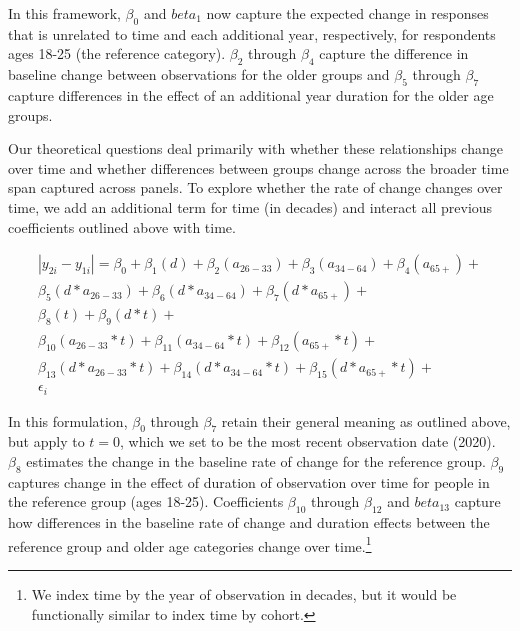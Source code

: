 \documentclass[
  12pt,
]{article}
\begin{document}
In this framework, \(\beta_0\) and \(beta_1\) now capture the expected change in responses that is unrelated to time and each additional year, respectively, for respondents ages 18-25 (the reference category). \(\beta_2\) through \(\beta_4\) capture the difference in baseline change between observations for the older groups and \(\beta_5\) through \(\beta_7\) capture differences in the effect of an additional year duration for the older age groups.

Our theoretical questions deal primarily with whether these relationships change over time and whether differences between groups change across the broader time span captured across panels. To explore whether the rate of change changes over time, we add an additional term for time (in decades) and interact all previous coefficients outlined above with time.

\begin{equation*}
 \begin{aligned}
   |y_{2i}-y_{1i} | = \beta_0 + \beta_1(d) + \beta_2(a_{26-33}) + \beta_3(a_{34-64}) + \beta_4(a_{65+}) + \\ 
   \beta_5(d*a_{26-33}) + \beta_6(d*a_{34-64}) + \beta_7(d*a_{65+}) + \\
   \beta_8(t) + \beta_9(d*t) + \\
   \beta_{10}(a_{26-33}*t) + \beta_{11}(a_{34-64}*t) + \beta_{12}(a_{65+}*t) + \\
   \beta_{13}(d*a_{26-33}*t) + \beta_{14}(d*a_{34-64}*t) + \beta_{15}(d*a_{65+}*t) + \\
   \epsilon_i
 \end{aligned}
 \end{equation*}

In this formulation, \(\beta_0\) through \(\beta_7\) retain their general meaning as outlined above, but apply to \(t = 0\), which we set to be the most recent observation date (2020). \(\beta_8\) estimates the change in the baseline rate of change for the reference group. \(\beta_9\) captures change in the effect of duration of observation over time for people in the reference group (ages 18-25). Coefficients \(\beta_{10}\) through \(\beta_{12}\) and \(beta_{13}\) capture how differences in the baseline rate of change and duration effects between the reference group and older age categories change over time.\footnote{We index time by the year of observation in decades, but it would be functionally similar to index time by cohort.}
\end{document}
